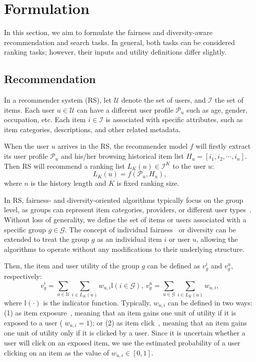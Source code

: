 \section{Formulation}
In this section, we aim to formulate the fairness and diversity-aware recommendation and search tasks. 
In general, both tasks can be considered ranking tasks; however, their inputs and utility definitions differ slightly.


\subsection{Recommendation}
In a recommender system (RS), let $\mathcal{U}$ denote the set of users, and $\mathcal{I}$ the set of items. Each user $u\in\mathcal{U}$ can have a different user profile $\mathcal{P}_u$ such as age, gender, occupation, etc.
Each item $i\in\mathcal{I}$ is associated with specific attributes, such as item categories, descriptions, and other related metadata. 

When the user $u$ arrives in the RS, the recommender model $f$ will 
firstly extract its user profile $\mathcal{P}_u$ and his/her browsing historical item list $H_u=[i_1, i_2, \cdots, i_n]$. Then RS will recommend a ranking list $L_K(u)\in\mathcal{I}^K$ to the user $u$:
\[
L_K(u) = f(\mathcal{P}_u, H_u),
\] 
where $n$ is the history length and $K$ is fixed ranking size.

In RS, fairness- and diversity-oriented algorithms typically focus on the group level, as groups can represent item categories, providers, or different user types~\cite{xu2023p, fairrec, li2021user}. Without loss of generality, we define the set of items or users associated with a specific group $g\in\mathcal{G}$. The concept of individual fairness~\cite{biega2018equity} or diversity can be extended to treat the group $g$ as an individual item $i$ or user $u$, allowing the algorithms to operate without any modifications to their underlying structure.

Then, the item and user utility of the group $g$ can be defined as $v_g^i$ and $v_g^u$, respectively:
\begin{equation}
     v_g^i = \sum_{u\in\mathcal{U}}\sum_{i\in L_K(u)} w_{u,i}\mathbb{I}(i\in\mathcal{G}),~v_g^u = \sum_{u\in\mathcal{G}}\sum_{i\in L_K(u)}w_{u,i},
\end{equation}
where $\mathbb{I}(\cdot)$ is the indicator function. Typically, $w_{u,i}$ can be defined in two ways: (1) as item exposure~\cite{xu2023p, fairrec}, meaning that an item gains one unit of utility if it is exposed to a user (\ie 
$w_{u,i}=1$); or (2) as item click~\cite{yang2019bid, liu2021neural}, meaning that an item gains one unit of utility only if it is clicked by a user. Since it is uncertain whether a user will click on an exposed item, we use the estimated probability of a user clicking on an item as the value of $w_{u,i}\in [0,1]$.


